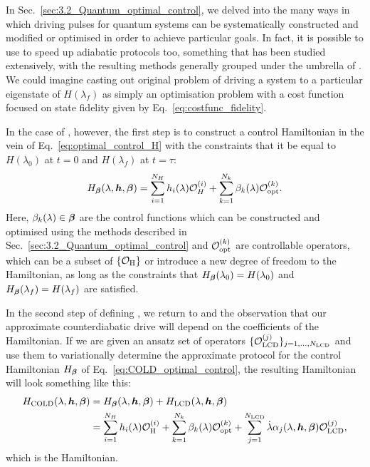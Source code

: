 In Sec.~\ref{sec:3.2_Quantum_optimal_control}, we delved into the many ways in which driving pulses for quantum systems can be systematically constructed and modified or optimised in order to achieve particular goals. In fact, it is possible to use  to speed up adiabatic protocols too, something that has been studied extensively, with the resulting methods generally grouped under the umbrella of  \cite{guery-odelin_shortcuts_2019}. We could imagine casting out original problem of driving a system to a particular eigenstate of $H(\lambda_f)$ as simply an optimisation problem with a cost function focused on state fidelity given by Eq.~\eqref{eq:costfunc_fidelity}. 

In the case of , however, the first step is to construct a control Hamiltonian in the vein of Eq.~\eqref{eq:optimal_control_H} with the constraints that it be equal to $H(\lambda_0)$ at $t=0$ and $H(\lambda_f)$ at $t=\tau$:
\begin{equation}\label{eq:COLD_optimal_control}
    H_{\boldsymbol{\beta}}(\lambda, \boldsymbol{h}, \boldsymbol{\beta}) = \sum_{i = 1}^{N_H} h_i(\lambda) \mathcal{O}_H^{(i)} + \sum_{k = 1}^{N_k} \beta_k(\lambda) \mathcal{O}_{\rm opt}^{(k)}.
\end{equation}
Here, $\beta_k(\lambda) \in \boldsymbol{\beta}$ are the control functions which can be constructed and optimised using the methods described in Sec.~\ref{sec:3.2_Quantum_optimal_control} and $\mathcal{O}_{\rm opt}^{(k)}$ are controllable operators, which can be a subset of $\{\mathcal{O}_{\rm H}\}$ or introduce a new degree of freedom to the Hamiltonian, as long as the constraints that $H_{\boldsymbol{\beta}}(\lambda_0) = H(\lambda_0)$ and $H_{\boldsymbol{\beta}}(\lambda_f) = H(\lambda_f)$ are satisfied. 

In the second step of defining , we return to  and the observation that our approximate counterdiabatic drive will depend on the coefficients of the Hamiltonian. If we are given an ansatz set of operators $\{\mathcal{O}_{\rm LCD}^{(j)}\}_{j = 1, ..., N_{\rm LCD}}$ and use them to variationally determine the approximate  protocol for the control Hamiltonian $H_{\boldsymbol{\beta}}$ of Eq.~\eqref{eq:COLD_optimal_control}, the resulting Hamiltonian will look something like this:
\begin{equation}\label{eq:COLD_Hamiltonian}
    \begin{aligned}
        H_{\rm COLD}(\lambda, \boldsymbol{h}, \boldsymbol{\beta}) &= H_{\boldsymbol{\beta}}(\lambda, \boldsymbol{h}, \boldsymbol{\beta}) + H_{\rm LCD}(\lambda, \boldsymbol{h}, \boldsymbol{\beta}) \\
        &= \sum_{i = 1}^{N_H} h_i(\lambda) \mathcal{O}_{\rm H}^{(i)} + \sum_{k = 1}^{N_k} \beta_k(\lambda) \mathcal{O}_{\rm opt}^{(k)} + \sum_{j = 1}^{N_{\rm LCD}} \dot{\lambda} \alpha_{j}(\lambda, \boldsymbol{h}, \boldsymbol{\beta}) \mathcal{O}_{\rm LCD}^{(j)},
    \end{aligned}
\end{equation}
which is the  Hamiltonian. 

